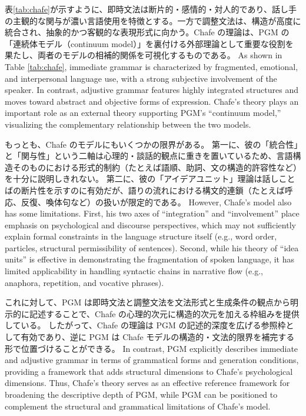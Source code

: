 \ifJPN
表\ref{tab:chafe}が示すように、即時文法は断片的・感情的・対人的であり、話し手の主観的な関与が濃い言語使用を特徴とする。一方で調整文法は、構造が高度に統合され、抽象的かつ客観的な表現形式に向かう。Chafe の理論は、PGM の「連続体モデル（continuum model）」を裏付ける外部理論として重要な役割を果たし、両者のモデルの相補的関係を可視化するものである。
\else
As shown in Table \ref{tab:chafe}, immediate grammar is characterized by fragmented, emotional, and interpersonal language use, with a strong subjective involvement of the speaker. In contrast, adjustive grammar features highly integrated structures and moves toward abstract and objective forms of expression. Chafe's theory plays an important role as an external theory supporting PGM's ``continuum model,'' visualizing the complementary relationship between the two models.
\fi

\ifJPN
もっとも、Chafe のモデルにもいくつかの限界がある。
第一に、彼の「統合性」と「関与性」という二軸は心理的・談話的観点に重きを置いているため、言語構造そのものにおける形式的制約（たとえば語順、助詞、文の構造的許容性など）を十分に説明しきれない。
第二に、彼の「アイデアユニット」理論は話しことばの断片性を示すのに有効だが、語りの流れにおける構文的連鎖（たとえば呼応、反復、喚体句など）の扱いが限定的である。
\else
However, Chafe's model also has some limitations.
First, his two axes of ``integration'' and ``involvement'' place emphasis on psychological and discourse perspectives, which may not sufficiently explain formal constraints in the language structure itself (e.g., word order, particles, structural permissibility of sentences).
Second, while his theory of ``idea units'' is effective in demonstrating the fragmentation of spoken language, it has limited applicability in handling syntactic chains in narrative flow (e.g., anaphora, repetition, and vocative phrases).
\fi

\ifJPN
これに対して、PGM は即時文法と調整文法を文法形式と生成条件の観点から明示的に記述することで、Chafe の心理的次元に構造的次元を加える枠組みを提供している。
したがって、Chafe の理論は PGM の記述的深度を広げる参照枠として有効であり、逆に PGM は Chafe モデルの構造的・文法的限界を補完する形で位置づけることができる。
\else
In contrast, PGM explicitly describes immediate and adjustive grammar in terms of grammatical forms and generation conditions, providing a framework that adds structural dimensions to Chafe's psychological dimensions.
Thus, Chafe's theory serves as an effective reference framework for broadening the descriptive depth of PGM, while PGM can be positioned to complement the structural and grammatical limitations of Chafe's model.
\fi

